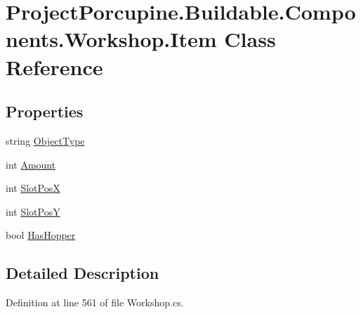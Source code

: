\hypertarget{class_project_porcupine_1_1_buildable_1_1_components_1_1_workshop_1_1_item}{}\section{Project\+Porcupine.\+Buildable.\+Components.\+Workshop.\+Item Class Reference}
\label{class_project_porcupine_1_1_buildable_1_1_components_1_1_workshop_1_1_item}
\subsection*{Properties}
\begin{DoxyCompactItemize}
\item 
string \hyperlink{class_project_porcupine_1_1_buildable_1_1_components_1_1_workshop_1_1_item_a98662715b92847a31988e030c9404c76}{Object\+Type}
\item 
int \hyperlink{class_project_porcupine_1_1_buildable_1_1_components_1_1_workshop_1_1_item_a6ab95f7af2184e858cef792d3a4da634}{Amount}
\item 
int \hyperlink{class_project_porcupine_1_1_buildable_1_1_components_1_1_workshop_1_1_item_a5126b36d09374e3e2a43c153b394ebfe}{Slot\+PosX}
\item 
int \hyperlink{class_project_porcupine_1_1_buildable_1_1_components_1_1_workshop_1_1_item_ac10a8f86171390fcdef67981c8440ac9}{Slot\+PosY}
\item 
bool \hyperlink{class_project_porcupine_1_1_buildable_1_1_components_1_1_workshop_1_1_item_a0bda821a267d89b5a5cbbbecad685f41}{Has\+Hopper}
\end{DoxyCompactItemize}


\subsection{Detailed Description}


Definition at line 561 of file Workshop.\+cs.



